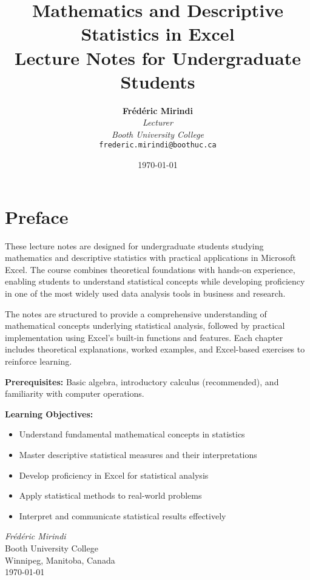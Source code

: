 \documentclass[12pt,a4paper]{book}
\title{\Huge\textbf{Mathematics and Descriptive Statistics in Excel}\\[0.5cm]
       \Large Lecture Notes for Undergraduate Students}
\author{\textbf{Frédéric Mirindi}\\[0.3cm]
        \textit{Lecturer}\\[0.2cm]
        \textit{Booth University College}\\[0.5cm]
        \texttt{frederic.mirindi@boothuc.ca}}
\date{\today}
\begin{document}
\maketitle

\tableofcontents
\listoffigures
\listoftables

\chapter*{Preface}

These lecture notes are designed for undergraduate students studying mathematics and descriptive statistics with practical applications in Microsoft Excel. The course combines theoretical foundations with hands-on experience, enabling students to understand statistical concepts while developing proficiency in one of the most widely used data analysis tools in business and research.

The notes are structured to provide a comprehensive understanding of mathematical concepts underlying statistical analysis, followed by practical implementation using Excel's built-in functions and features. Each chapter includes theoretical explanations, worked examples, and Excel-based exercises to reinforce learning.

\textbf{Prerequisites:} Basic algebra, introductory calculus (recommended), and familiarity with computer operations.

\textbf{Learning Objectives:}
\begin{itemize}
    \item Understand fundamental mathematical concepts in statistics
    \item Master descriptive statistical measures and their interpretations
    \item Develop proficiency in Excel for statistical analysis
    \item Apply statistical methods to real-world problems
    \item Interpret and communicate statistical results effectively
\end{itemize}

\vfill
\textit{Frédéric Mirindi}\\[0.2cm]
Booth University College\\[0.2cm]
Winnipeg, Manitoba, Canada\\[0.2cm]
\today

\newpage

\end{document}
